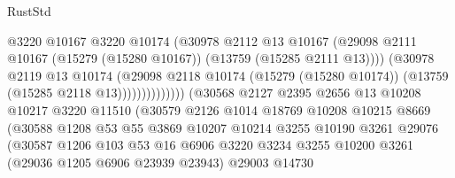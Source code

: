 \begin{lexlean}{RustStd}
\begin{coremodule}
                                          @3220
                                          @10167
                                          @3220
                                          @10174
                                          (@30978
                                            @2112
                                            @13
                                            @10167
                                            (@29098
                                              @2111
                                              @10167
                                              (@15279 (@15280 @10167))
                                              (@13759 (@15285 @2111 @13))))
                                          (@30978
                                            @2119
                                            @13
                                            @10174
                                            (@29098
                                              @2118
                                              @10174
                                              (@15279 (@15280 @10174))
                                              (@13759 (@15285 @2118 @13))))))))))))))
                      (@30568
                        @2127
                        @2395
                        @2656
                        @13
                        @10208
                        @10217
                        @3220
                        @11510
                        (@30579
                          @2126
                          @1014
                          @18769
                          @10208
                          @10215
                          @8669
                          (@30588
                            @1208
                            @53
                            @55
                            @3869
                            @10207
                            @10214
                            @3255
                            @10190
                            @3261
                            @29076
                            (@30587
                              @1206
                              @103
                              @53
                              @16
                              @6906
                              @3220
                              @3234
                              @3255
                              @10200
                              @3261
                              (@29036 @1205 @6906 @23939 @23943)
                              @29003
                              @14730

\end{coremodule}
\end{lexlean}
